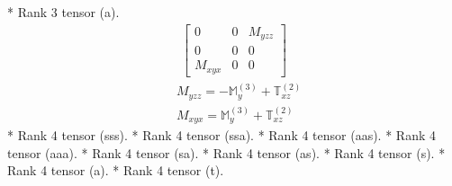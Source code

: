 \documentclass[fleqn,8pt,landscape]{jsarticle}
\begin{document}
* Rank 3 tensor (a).
\begin{align*}
\begin{bmatrix} 0 & 0 & M_{yzz} \\ 0 & 0 & 0 \\ M_{xyx} & 0 & 0 \end{bmatrix}
\end{align*}
\begin{align*}
& M_{yzz} = - \mathbb{M}_{y}^{(3)} + \mathbb{T}_{xz}^{(2)} \\
& M_{xyx} = \mathbb{M}_{y}^{(3)} + \mathbb{T}_{xz}^{(2)}
\end{align*}
* Rank 4 tensor (sss).
* Rank 4 tensor (ssa).
* Rank 4 tensor (aas).
* Rank 4 tensor (aaa).
* Rank 4 tensor (sa).
* Rank 4 tensor (as).
* Rank 4 tensor (s).
* Rank 4 tensor (a).
* Rank 4 tensor (t).
\end{document}

